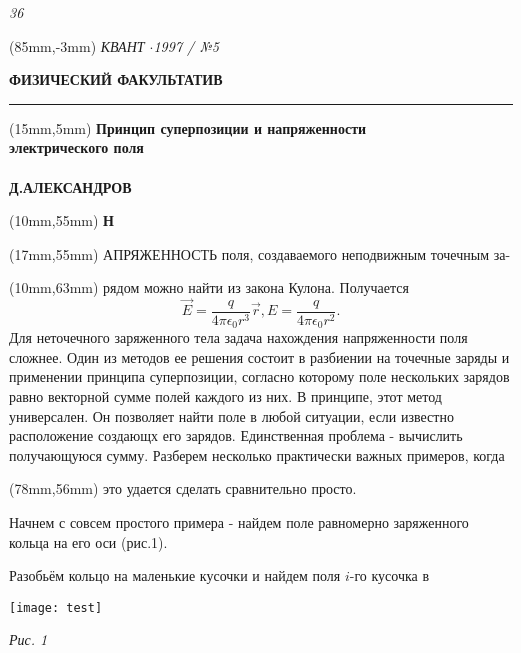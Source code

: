 \documentclass[a4paper,10pt]{article}
\begin{document}
	\begin{flushleft}
	\textit{36}
	\begin{textblock*}{100mm}(85mm,-3mm)
	\textit{КВАНТ $\cdot$1997 / №5}
	\end{textblock*}
	\vspace{6cm}
	\end{flushleft}
	\begin{center}
		\large{\textbf{ФИЗИЧЕСКИЙ ФАКУЛЬТАТИВ}}\\
		\noindent\rule{20cm}{0.4pt}
	\end{center}
	\begin{textblock*}{90mm}(15mm,5mm)
	\Huge{\textbf{Принцип суперпозиции и напряженности\\ электрического поля}}
	\\ \\
	\Large{\textbf{Д.АЛЕКСАНДРОВ}}
	\end{textblock*}
	\begin{textblock*}{50mm}(10mm,55mm)
	\Huge{\textbf{Н}}
	\end{textblock*}
	\begin{textblock*}{57mm}(17mm,55mm)
	АПРЯЖЕННОСТЬ поля, создаваемого неподвижным точечным за-
	\end{textblock*}
	\begin{textblock*}{64mm}(10mm,63mm)
	рядом можно найти из закона Кулона. Получается 
$$\vec{E}=\frac{q}{4\pi\epsilon_{0}r^3}\vec{r}, E=\frac{q}{4\pi\epsilon_{0}r^2}.$$
	Для неточечного заряженного тела задача нахождения напряженности поля сложнее. Один из методов ее решения состоит в разбиении на точечные заряды и применении принципа суперпозиции, согласно которому поле нескольких зарядов равно векторной сумме полей каждого из них. В принципе, этот метод универсален. Он позволяет найти поле в любой ситуации, если известно расположение создающх его зарядов. Единственная проблема - вычислить получающуюся сумму. Разберем несколько практически важных примеров, когда 
	\end{textblock*}
	\begin{textblock*}{64mm}(78mm,56mm)
	это удается сделать сравнительно просто. \par Начнем с совсем простого примера - найдем поле равномерно заряженного кольца на его оси (рис.1). \par
	Разобьём кольцо на маленькие кусочки и найдем поля $i$-го кусочка в
	\begin{center}
	\texttt{[image: test]}
	\end{center}
	\begin{flushleft}
	\textit{Рис. 1}
	\end{flushleft}
	\end{textblock*}
\end{document}
